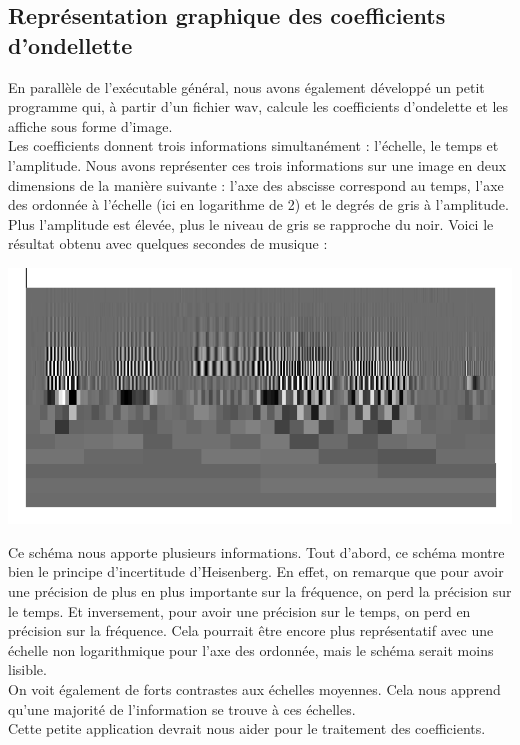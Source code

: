 \documentclass[a4paper,12pt]{article}
\begin{document}
	\subsection{Représentation graphique des coefficients d'ondellette}
En parallèle de l'exécutable général, nous avons également développé
un petit programme qui, à partir d'un fichier wav, calcule les
coefficients d'ondelette et les affiche sous forme d'image.\\
Les coefficients donnent trois informations simultanément :
l'échelle, le temps et l'amplitude. Nous avons représenter ces trois
informations sur une image en deux dimensions de la manière suivante
: l'axe des abscisse correspond au temps, l'axe des ordonnée à
l'échelle (ici en logarithme de 2) et le degrés de gris à l'amplitude. Plus
l'amplitude est élevée, plus le niveau de gris se rapproche du noir.
Voici le résultat obtenu avec quelques secondes de musique :\\
\begin{center}
\includegraphics[scale=0.50]{img/coeffs.png}
\end{center}
Ce schéma nous apporte plusieurs informations. Tout d'abord, ce schéma
montre bien le principe d'incertitude d'Heisenberg. En effet, on
remarque que pour avoir une précision de plus en plus importante sur
la fréquence, on perd la précision sur le temps. Et inversement, pour
avoir une précision sur le temps, on perd en précision sur la
fréquence. Cela pourrait être encore plus représentatif avec une
échelle non logarithmique pour l'axe des ordonnée, mais le schéma
serait moins lisible.\\
On voit également de forts contrastes aux échelles moyennes. Cela nous
apprend qu'une majorité de l'information se trouve à ces échelles.
\\
Cette petite application devrait nous aider pour le traitement des
coefficients.
\end{document}
